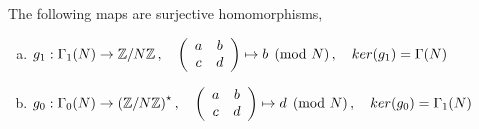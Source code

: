 \begin{lemma} \label{lem:surjectiveHomsGamma}
The following maps are surjective homomorphisms,
\begin{enumerate}[(a)]
\item $g_1 : \Gamma_1(N) \rightarrow \mathbb{Z}/N\mathbb{Z} \, , \quad \left(
      \begin{array}{ c c }
         a & b \\
         c & d
      \end{array} \right) \mapsto b \pmod N \, , \quad ker(g_1) = \Gamma(N)$
\item $g_0 : \Gamma_0(N) \rightarrow {(\mathbb{Z}/N\mathbb{Z})}^\star \, , \quad \left(
      \begin{array}{ c c }
         a & b \\
         c & d
      \end{array} \right) \mapsto d \pmod N \, , \quad ker(g_0) = \Gamma_1(N)$
\end{enumerate}
\end{lemma}

